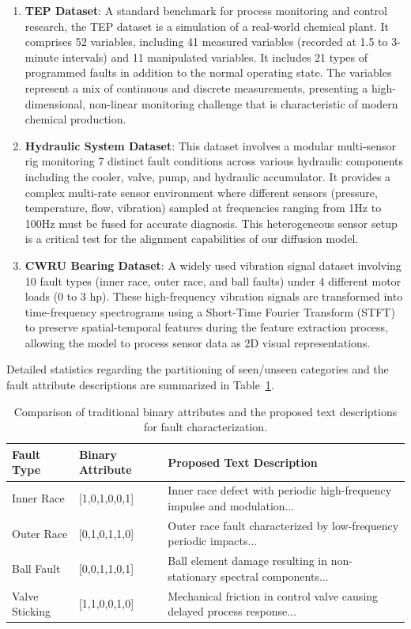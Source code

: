 \documentclass[journal]{IEEEtran}
\begin{document}
\begin{enumerate}
    \item \textbf{TEP Dataset}: A standard benchmark for process monitoring and control research, the TEP dataset is a simulation of a real-world chemical plant. It comprises 52 variables, including 41 measured variables (recorded at 1.5 to 3-minute intervals) and 11 manipulated variables. It includes 21 types of programmed faults in addition to the normal operating state. The variables represent a mix of continuous and discrete measurements, presenting a high-dimensional, non-linear monitoring challenge that is characteristic of modern chemical production.
    \item \textbf{Hydraulic System Dataset}: This dataset involves a modular multi-sensor rig monitoring 7 distinct fault conditions across various hydraulic components including the cooler, valve, pump, and hydraulic accumulator. It provides a complex multi-rate sensor environment where different sensors (pressure, temperature, flow, vibration) sampled at frequencies ranging from 1Hz to 100Hz must be fused for accurate diagnosis. This heterogeneous sensor setup is a critical test for the alignment capabilities of our diffusion model.
    \item \textbf{CWRU Bearing Dataset}: A widely used vibration signal dataset involving 10 fault types (inner race, outer race, and ball faults) under 4 different motor loads (0 to 3 hp). These high-frequency vibration signals are transformed into time-frequency spectrograms using a Short-Time Fourier Transform (STFT) to preserve spatial-temporal features during the feature extraction process, allowing the model to process sensor data as 2D visual representations.
\end{enumerate}
Detailed statistics regarding the partitioning of seen/unseen categories and the fault attribute descriptions are summarized in Table~\ref{tab:attribute_comparison}.

\begin{table}[htbp]
\centering
\caption{Comparison of traditional binary attributes and the proposed text descriptions for fault characterization.}
\label{tab:attribute_comparison}
\begin{tabular}{lll}
\toprule
Fault Type & Binary Attribute & Proposed Text Description \\
\midrule
Inner Race & [1,0,1,0,0,1] & Inner race defect with periodic high-frequency impulse and modulation... \\
Outer Race & [0,1,0,1,1,0] & Outer race fault characterized by low-frequency periodic impacts... \\
Ball Fault & [0,0,1,1,0,1] & Ball element damage resulting in non-stationary spectral components... \\
Valve Sticking & [1,1,0,0,1,0] & Mechanical friction in control valve causing delayed process response... \\
\bottomrule
\end{tabular}
\end{table}
\end{document}
